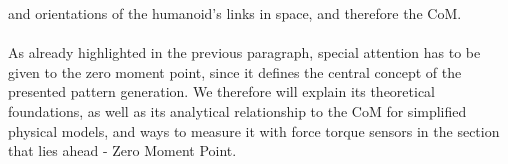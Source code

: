 and orientations of the humanoid's links in space, and therefore the CoM.
\\\\
As already highlighted in the previous paragraph, special attention has to be given to the zero moment point, since it defines the central concept of the presented pattern generation. We therefore will explain its theoretical foundations, as well as its analytical relationship to the CoM for simplified physical models, and ways to measure it with force torque sensors in the section that lies ahead - Zero Moment Point.





 